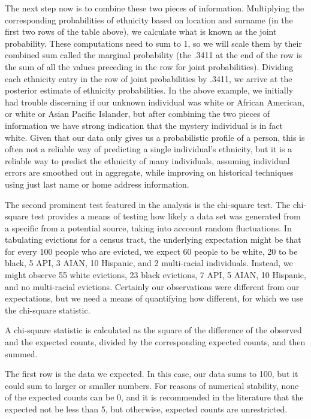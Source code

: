 \par The next step now is to combine these two pieces of information.  Multiplying the corresponding probabilities of ethnicity based on location and surname (in the first two rows of the table above), we calculate what is known as the joint probability.  These computations need to sum to 1, so we will scale them by their combined sum called the marginal probability (the .3411 at the end of the row is the sum of all the values preceding in the row for joint probabilities).  Dividing each ethnicity entry in the row of joint probabilities by .3411, we arrive at the posterior estimate of ethnicity probabilities.  In the above example, we initially had trouble discerning if our unknown individual was white or African American, or white or Asian Pacific Islander, but after combining the two pieces of information we have strong indication that the mystery individual is in fact white.  Given that our data only gives us a probabilistic profile of a person, this is often not a reliable way of predicting a single individual's ethnicity, but it is a reliable way to predict the ethnicity of many individuals, assuming individual errors are smoothed out in aggregate, while improving on historical techniques using just last name or home address information.

\par The second prominent test featured in the analysis is the chi-square test.  The chi-square test provides a means of testing how likely a data set was generated from a specific  from a potential source, taking into account random fluctuations.  In tabulating evictions for a census tract, the underlying expectation might be that for every 100 people who are evicted, we expect 60 people to be white, 20 to be black, 5 API, 3 AIAN, 10 Hispanic, and 2 multi-racial individuals.  Instead, we might observe 55 white evictions, 23 black evictions, 7 API, 5 AIAN, 10 Hispanic, and no multi-racial evictions.  Certainly our observations were different from our expectations, but we need a means of quantifying how different, for which we use the chi-square statistic.

\par A chi-square statistic is calculated as the square of the difference of the observed and the expected counts, divided by the corresponding expected counts, and then summed.

\par The first row is the data we expected.  In this case, our data sums to 100, but it could sum to larger or smaller numbers.  For reasons of numerical stability, none of the expected counts can be 0, and it is recommended in the literature that the expected not be less than 5, but otherwise, expected counts are unrestricted.

